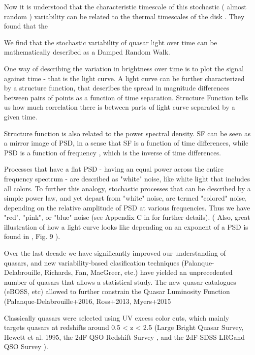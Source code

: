 \documentclass[modern]{aastex62}
\begin{document}
Now it is understood that the characteristic timescale of this stochastic ( almost random ) variability can be related to the thermal timescales of the disk \citep{kelly2007, zu2013, kozlowski2016a}. They found that the 


We find that the stochastic variability of quasar light over time can be mathematically described as a Damped Random Walk. 



One way of describing the variation in brightness over time is to plot the signal against time - that is the light curve.  A light curve can be further characterized by a structure function, that describes the spread in magnitude differences between pairs of points as a function of time separation. Structure Function tells us how much correlation there is between parts of light curve separated by a given time.  

Structure function is also related to the power spectral density. SF can be seen as a mirror image of PSD, in a sense that SF is a function of time differences, while PSD is a function of frequency , which is the inverse of  time differences. 

Processes that have a flat PSD - having an equal power across the entire frequency spectrum -  are described as "white" noise, like white light that includes all colors. To further this analogy, stochastic processes that can be described by a simple power law, and yet depart from "white" noise, are termed  "colored" noise, depending on the relative amplitude of PSD at various frequencies. Thus we have "red", "pink", or "blue" noise   (see Appendix  C in \cite{kasliwal2017} for further details). ( Also, great illustration of how a light curve looks like depending on an exponent of a PSD is found in \cite{macleod2010}, Fig. 9 ). 



Over the last decade we have significantly improved our understanding of quasars, and new variability-based clasification techniques (Palanque-Delabrouille,  Richards,  Fan,  MacGreer, etc.) have yielded an unprecedented number of quasars that allows a statistical study. The new quasar catalogues (eBOSS, etc) allowed  to further constrain the Quasar Luminosity Function (Palanque-Delabrouille+2016, Ross+2013, Myers+2015 

Classically quasars were selected using UV excess color cuts,  which mainly targets quasars at redshifts around 0.5 < z < 2.5 (Large Bright Quasar Survey, Hewett et al. 1995, the 2dF QSO Redshift Survey \cite{croom2004}, and the 2dF-SDSS LRGand QSO Survey \cite{croom2009}). 
\end{document}
